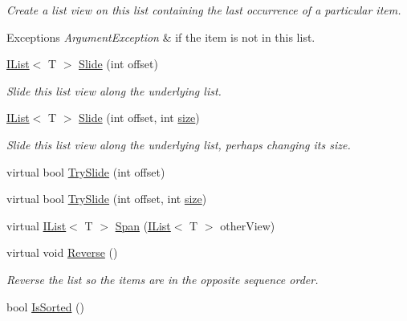 \begin{DoxyCompactItemize}
\begin{DoxyCompactList}\small\item\em Create a list view on this list containing the last occurrence of a particular item. 
\begin{DoxyExceptions}{Exceptions}
{\em Argument\+Exception} & if the item is not in this list. \\
\hline
\end{DoxyExceptions}
\end{DoxyCompactList}\item 
\hyperlink{interface_c5_1_1_i_list}{I\+List}$<$ T $>$ \hyperlink{class_c5_1_1_linked_list_a0bd55eb8e379395d72a47187f5431061}{Slide} (int offset)
\begin{DoxyCompactList}\small\item\em Slide this list view along the underlying list. \end{DoxyCompactList}\item 
\hyperlink{interface_c5_1_1_i_list}{I\+List}$<$ T $>$ \hyperlink{class_c5_1_1_linked_list_a644771ef90552299136836d56557366a}{Slide} (int offset, int \hyperlink{class_c5_1_1_collection_base_ab524b118754a5a8290b6528511272833}{size})
\begin{DoxyCompactList}\small\item\em Slide this list view along the underlying list, perhaps changing its size. \end{DoxyCompactList}\item 
virtual bool \hyperlink{class_c5_1_1_linked_list_aa3edb83d326790e7751787b57c2c5558}{Try\+Slide} (int offset)
\item 
virtual bool \hyperlink{class_c5_1_1_linked_list_ae6cc230d1dfaa700403c45c5904cd177}{Try\+Slide} (int offset, int \hyperlink{class_c5_1_1_collection_base_ab524b118754a5a8290b6528511272833}{size})
\item 
virtual \hyperlink{interface_c5_1_1_i_list}{I\+List}$<$ T $>$ \hyperlink{class_c5_1_1_linked_list_a40eaced4f51f9754a7929c7960bbd036}{Span} (\hyperlink{interface_c5_1_1_i_list}{I\+List}$<$ T $>$ other\+View)
\item 
virtual void \hyperlink{class_c5_1_1_linked_list_a6c38be97b81a7500051886eff4ee7932}{Reverse} ()
\begin{DoxyCompactList}\small\item\em Reverse the list so the items are in the opposite sequence order. \end{DoxyCompactList}\item 
bool \hyperlink{class_c5_1_1_linked_list_abb78955cf98434f86b34ba8d363cb062}{Is\+Sorted} ()

\end{DoxyCompactItemize}
